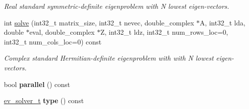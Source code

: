 \begin{DoxyCompactItemize}
\begin{DoxyCompactList}\small\item\em Real standard symmetric-\/definite eigenproblem with N lowest eigen-\/vectors. \end{DoxyCompactList}\item 
int \hyperlink{class_eigenproblem__scalapack_a632f03be9a50f73459d597d4683cf91e}{solve} (int32\+\_\+t matrix\+\_\+size, int32\+\_\+t nevec, double\+\_\+complex $\ast$A, int32\+\_\+t lda, double $\ast$eval, double\+\_\+complex $\ast$Z, int32\+\_\+t ldz, int32\+\_\+t num\+\_\+rows\+\_\+loc=0, int32\+\_\+t num\+\_\+cols\+\_\+loc=0) const 
\begin{DoxyCompactList}\small\item\em Complex standard Hermitian-\/definite eigenproblem with with N lowest eigen-\/vectors. \end{DoxyCompactList}\item 
\hypertarget{class_eigenproblem__scalapack_a6a26893ea8b9fe41761b6c691f8c6fa6}{}bool {\bfseries parallel} () const \label{class_eigenproblem__scalapack_a6a26893ea8b9fe41761b6c691f8c6fa6}

\item 
\hypertarget{class_eigenproblem__scalapack_ae8fe13ebb5d4d8809cf5d9da2900379c}{}\hyperlink{eigenproblem_8h_a203f2c57422a6e64834e6e9ab85982bf}{ev\+\_\+solver\+\_\+t} {\bfseries type} () const \label{class_eigenproblem__scalapack_ae8fe13ebb5d4d8809cf5d9da2900379c}

\end{DoxyCompactItemize}
